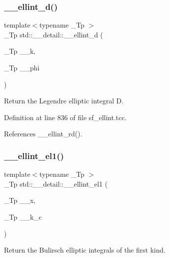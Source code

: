 \mbox{\label{namespacestd_1_1____detail_a00da42d89830fd51e9934fe0c5e08b7f}} 
\subsubsection{\texorpdfstring{\+\_\+\+\_\+ellint\+\_\+d()}{\_\_ellint\_d()}}
{\footnotesize\ttfamily template$<$typename \+\_\+\+Tp $>$ \\
\+\_\+\+Tp std\+::\+\_\+\+\_\+detail\+::\+\_\+\+\_\+ellint\+\_\+d (\begin{DoxyParamCaption}\item[{\+\_\+\+Tp}]{\+\_\+\+\_\+k,  }\item[{\+\_\+\+Tp}]{\+\_\+\+\_\+phi }\end{DoxyParamCaption})}

Return the Legendre elliptic integral D. 

Definition at line 836 of file sf\+\_\+ellint.\+tcc.



References \+\_\+\+\_\+ellint\+\_\+rd().

\mbox{\label{namespacestd_1_1____detail_aa17b1b382a89552f49fbb8c5eda1d50f}} 
\subsubsection{\texorpdfstring{\+\_\+\+\_\+ellint\+\_\+el1()}{\_\_ellint\_el1()}}
{\footnotesize\ttfamily template$<$typename \+\_\+\+Tp $>$ \\
\+\_\+\+Tp std\+::\+\_\+\+\_\+detail\+::\+\_\+\+\_\+ellint\+\_\+el1 (\begin{DoxyParamCaption}\item[{\+\_\+\+Tp}]{\+\_\+\+\_\+x,  }\item[{\+\_\+\+Tp}]{\+\_\+\+\_\+k\+\_\+c }\end{DoxyParamCaption})}

Return the Bulirsch elliptic integrals of the first kind. 

